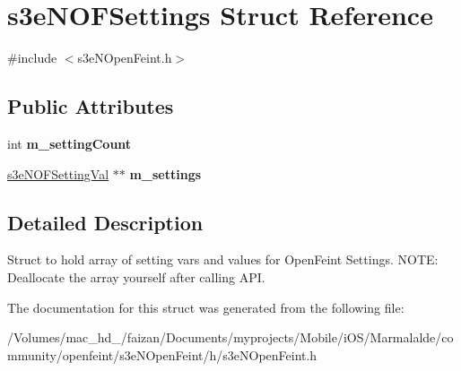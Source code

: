 \hypertarget{structs3e_n_o_f_settings}{
\section{s3eNOFSettings Struct Reference}
\label{structs3e_n_o_f_settings}
}


{\ttfamily \#include $<$s3eNOpenFeint.h$>$}

\subsection*{Public Attributes}
\begin{DoxyCompactItemize}
\item 
\hypertarget{structs3e_n_o_f_settings_a49975f78aec4d957857034f8c6132cad}{
int {\bfseries m\_\-settingCount}}
\label{structs3e_n_o_f_settings_a49975f78aec4d957857034f8c6132cad}

\item 
\hypertarget{group___n_open_feint_api_group_ga02c14e35d772130e5b77cabb7fa73a9b}{
\hyperlink{structs3e_n_o_f_setting_val}{s3eNOFSettingVal} $\ast$$\ast$ {\bfseries m\_\-settings}}
\label{group___n_open_feint_api_group_ga02c14e35d772130e5b77cabb7fa73a9b}

\end{DoxyCompactItemize}


\subsection{Detailed Description}
Struct to hold array of setting vars and values for OpenFeint Settings. NOTE: Deallocate the array yourself after calling API. 

The documentation for this struct was generated from the following file:\begin{DoxyCompactItemize}
\item 
/Volumes/mac\_\-hd\_/faizan/Documents/myprojects/Mobile/iOS/Marmalalde/community/openfeint/s3eNOpenFeint/h/s3eNOpenFeint.h\end{DoxyCompactItemize}
